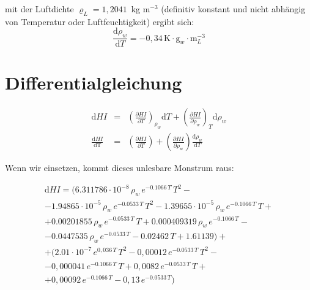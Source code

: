 \documentclass{article}
\begin{document}
mit der Luftdichte $\varrho_L = 1,2041 \,$ kg m$^{-3}$ (definitiv konstant und nicht abhängig von Temperatur oder Luftfeuchtigkeit) ergibt sich:
\begin{equation}
    \frac{\mathrm d \rho_w}{\mathrm d T} = -0,34 \, \mathrm K \cdot \mathrm{g}_w \cdot \mathrm{m}_L^{-3}
\end{equation}

\section{Differentialgleichung}
\begin{eqnarray}
    \mathrm{d} HI &=& \left( \frac{\partial HI}{\partial T} \right)_{\rho_w} \mathrm d T + \left( \frac{\partial HI}{\partial \rho_w} \right)_T \mathrm d \rho_w \\
    \frac{\mathrm d HI}{\mathrm{d T}} &=& \left( \frac{\partial HI}{\partial T} \right) + \left( \frac{\partial HI}{\partial \rho_w} \right) \frac{\mathrm d \rho_w}{\mathrm d T}
\end{eqnarray}

Wenn wir einsetzen, kommt dieses unlesbare Monstrum raus:

\begin{multline}
    \mathrm d HI = ( 6.311786 \cdot 10^{-8}\, \rho_w\, e^{-0.1066\, T}\, T^2 - \\ - 1.94865 \cdot 10^{-5}\, \rho_w\, e^{-0.0533\, T}\, T^2 - 1.39655 \cdot 10^{-5}\, \rho_w\, e^{-0.1066\, T}\, T + \\  + 0.00201855\, \rho_w\, e^{-0.0533\, T}\, T + 0.000409319\, \rho_w\, e^{-0.1066\, T} - \\ - 0.0447535\, \rho_w\, e^{-0.0533\, T} - 0.02462\, T + 1.61139 ) + \\ + (2.01 \cdot 10^{-7}\, e^{0,036\, T}\, T^2 - 0,00012\, e^{-0.0533\, T}\, T^2 - \\ - 0,000041\, e^{-0.1066\, T}\, T + 0,0082\, e^{-0.0533\, T}\, T + \\ + 0,00092\, e^{-0.1066\, T} - 0,13\, e^{-0.0533\, T})
\end{multline}
\end{document}

